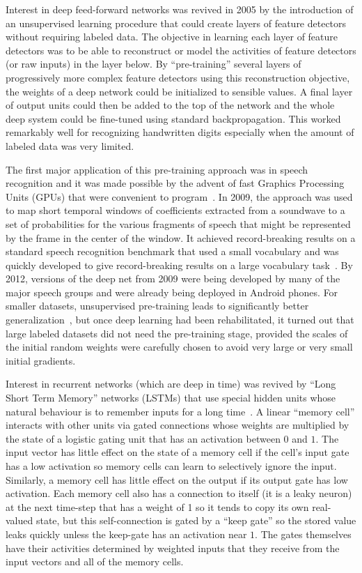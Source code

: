 \documentclass[]{article}
\begin{document}
Interest in deep feed-forward networks was revived in 2005\cite{IJCAI} by
the introduction of an unsupervised learning procedure that could create
layers of feature detectors without requiring labeled data. The objective
in learning each layer of feature detectors was to be able to reconstruct
or model the activities of feature detectors (or raw inputs) in the layer
below.  By ``pre-training'' several layers of progressively more complex
feature detectors using this reconstruction objective, the weights of a
deep network could be initialized to sensible values.  A final layer of
output units could then be added to the top of the network and the whole
deep system could be fine-tuned using standard
backpropagation\cite{Science}. This worked remarkably well for recognizing
handwritten digits especially when the amount of labeled data was very
limited\cite{Bengio-nips-2006-small}.

The first major application of this pre-training approach was in speech
recognition and it was made possible by the advent of fast Graphics
Processing Units (GPUs) that were convenient to program~\citep{RainaICML09-small}.  
In 2009, the approach was used to map short temporal windows of coefficients extracted
from a soundwave to a set of probabilities for the various fragments of
speech that might be represented by the frame in the center of the window.
It achieved record-breaking results on a standard speech recognition
benchmark that used a small vocabulary\cite{TIMITpaper} and was quickly
developed to give record-breaking results on a large vocabulary
task~\cite{Dahl}.  By 2012, versions of the deep net from 2009 were being
developed by many of the major speech groups\cite{SPS} and were already
being deployed in Android phones.  For smaller datasets, unsupervised
pre-training leads to significantly better generalization~\citep{Erhan+al-2010-small}, 
but once deep
learning had been rehabilitated, it turned out that large labeled datasets
did not need the pre-training stage, provided the scales of the initial
random weights were carefully chosen to avoid very large or very small
initial gradients.

Interest in recurrent networks (which are deep in time) was revived by
``Long Short Term Memory'' networks (LSTMs) that use special hidden units
whose natural behaviour is to remember inputs for a long
time~\cite{Hochreiter+Schmidhuber-1997}.  
A linear ``memory cell'' interacts with other units
via gated connections whose weights are multiplied by the state of a
logistic gating unit that has an activation between $0$ and $1$. The input
vector has little effect on the state of a memory cell if the cell's input
gate has a low activation so memory cells can learn to selectively ignore
the input.  Similarly, a memory cell has little effect on the output if its
output gate has low activation. Each memory cell also has a connection to
itself (it is a leaky neuron) at the next time-step that has a weight of 1 so it tends to copy its
own real-valued state, but this self-connection is gated by a ``keep gate'' so
the stored value leaks quickly unless the keep-gate has an activation
near $1$.  The gates themselves have their activities determined by
weighted inputs that they receive from the input vectors and all of the
memory cells.
\end{document}
